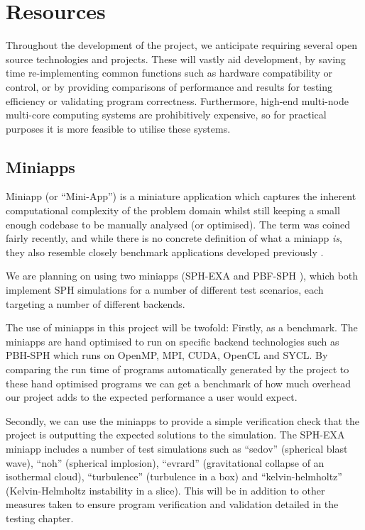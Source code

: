 \chapter{Resources}

Throughout the development of the project, we anticipate requiring several open source technologies and projects. These will vastly aid development, by saving time re-implementing common functions such as hardware compatibility or control, or by providing comparisons of performance and results for testing efficiency or validating program correctness. Furthermore, high-end multi-node multi-core computing systems are prohibitively expensive, so for practical purposes it is more feasible to utilise these systems. 

\section{Miniapps}

Miniapp (or ``Mini-App'') is a miniature application which captures the inherent computational complexity of the problem domain whilst still keeping a small enough codebase to be manually analysed (or optimised). The term was coined fairly recently, and while there is no concrete definition of what a miniapp \textit{is}, they also resemble closely benchmark applications developed previously \cite{miniapp}.

We are planning on using two miniapps (SPH-EXA \cite{sphexa} and PBF-SPH \cite{pbfsph}), which both implement SPH simulations for a number of different test scenarios, each targeting a number of different backends. 

The use of miniapps in this project will be twofold: Firstly, as a benchmark. The miniapps are hand optimised to run on specific backend technologies such as PBH-SPH which runs on OpenMP, MPI, CUDA, OpenCL and SYCL. By comparing the run time of programs automatically generated by the project to these hand optimised programs we can get a benchmark of how much overhead our project adds to the expected performance a user would expect.

Secondly, we can use the miniapps to provide a simple verification check that the project is outputting the expected solutions to the simulation. The SPH-EXA miniapp includes a number of test simulations such as ``sedov'' \cite{sedov} (spherical blast wave), ``noh'' (spherical implosion), ``evrard'' (gravitational collapse of an isothermal cloud), ``turbulence'' (turbulence in a box) and ``kelvin-helmholtz'' (Kelvin-Helmholtz instability in a slice). This will be in addition to other measures taken to ensure program verification and validation detailed in the testing chapter.

